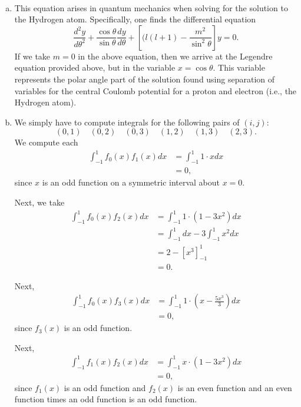 \documentclass[12pt]{article} %
\begin{document}
\begin{solution}~
\begin{enumerate}[(a)]
    \item This equation arises in quantum mechanics when solving for the solution to the Hydrogen atom.  Specifically, one finds the differential equation
    \[
    \frac{d^2y}{d\theta^2} + \frac{\cos \theta}{\sin \theta} \frac{dy}{d\theta} + \left[ (l(l+1)-\frac{m^2}{\sin^2 \theta} \right]y =0.
    \]
    If we take $m=0$ in the above equation, then we arrive at the Legendre equation provided above, but in the variable $x=\cos\theta$.  This variable represents the polar angle part of the solution found using separation of variables for the central Coulomb potential for a proton and electron (i.e., the Hydrogen atom).
    \item We simply have to compute integrals for the following pairs of $(i,j)$:
    \[
    (0,1) \quad (0,2) \quad (0,3) \quad (1,2) \quad (1,3) \quad (2,3).
    \]
    We compute each
    \begin{align*}
        \int_{-1}^1 f_0(x)f_1(x)dx &= \int_{-1}^1 1\cdot x dx \\
        &=0,
    \end{align*}
    since $x$ is an odd function on a symmetric interval about $x=0$.
    
    Next, we take
    \begin{align*}
        \int_{-1}^1 f_0(x)f_2(x) dx &= \int_{-1}^1 1\cdot (1-3x^2)dx\\
        &= \int_{-1}^1 dx - 3 \int_{-1}^1 x^2 dx\\
        &= 2 - \left[ x^3\right]_{-1}^1 \\
        &= 0.
    \end{align*}
    
    Next,
    \begin{align*}
        \int_{-1}^1 f_0(x) f_3(x) dx &= \int_{-1}^1 1 \cdot \left( x-\frac{5x^3}{3}\right)dx\\
        &= 0,
    \end{align*}
    since $f_3(x)$ is an odd function. 
    
    Next,
    \begin{align*}
        \int_{-1}^1 f_1(x)f_2(x)dx&= \int_{-1}^1 x\cdot \left(1-3x^2\right) dx\\
        &=0,
    \end{align*}
    since $f_1(x)$ is an odd function and $f_2(x)$ is an even function and an even function times an odd function is an odd function.
    

\end{enumerate}
\end{solution}
\end{document}
